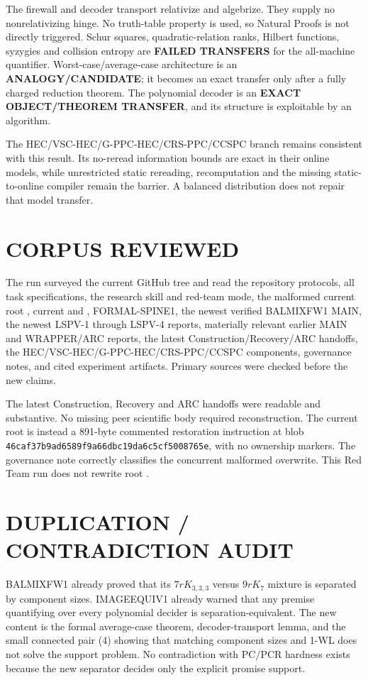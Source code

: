 \documentclass[11pt]{article}
\begin{document}
The firewall and decoder transport relativize and algebrize.  They supply no
nonrelativizing hinge.  No truth-table property is used, so Natural Proofs
is not directly triggered.  Schur squares, quadratic-relation ranks,
Hilbert functions, syzygies and collision entropy are \textbf{FAILED
TRANSFERS} for the all-machine quantifier.  Worst-case/average-case
architecture is an \textbf{ANALOGY/CANDIDATE}; it becomes an exact transfer
only after a fully charged reduction theorem.  The polynomial decoder is an
\textbf{EXACT OBJECT/THEOREM TRANSFER}, and its structure is exploitable by
an algorithm.

The HEC/VSC-HEC/G-PPC-HEC/CRS-PPC/CCSPC branch remains consistent with this
result.  Its no-reread information bounds are exact in their online models,
while unrestricted static rereading, recomputation and the missing
static-to-online compiler remain the barrier.  A balanced distribution does
not repair that model transfer.

\section{CORPUS REVIEWED}
The run surveyed the current GitHub tree and read the repository protocols,
all task specifications, the research skill and red-team mode, the malformed
current root , current  and
, FORMAL-SPINE1, the newest verified BALMIXFW1 MAIN, the
newest LSPV-1 through LSPV-4 reports, materially relevant earlier MAIN and
WRAPPER/ARC reports, the latest Construction/Recovery/ARC handoffs, the
HEC/VSC-HEC/G-PPC-HEC/CRS-PPC/CCSPC components, governance notes, and cited
experiment artifacts.  Primary sources \cite{bt,hk,conneryd,flmv} were
checked before the new claims.

The latest Construction, Recovery and ARC handoffs were readable and
substantive.  No missing peer scientific body required reconstruction.  The
current root is instead a 891-byte commented restoration instruction at blob
\texttt{46caf37b9ad6589f9a66dbc19da6c5cf5008765e}, with no ownership markers.
The governance note correctly classifies the concurrent malformed overwrite.
This Red Team run does not rewrite root .

\section{DUPLICATION / CONTRADICTION AUDIT}
BALMIXFW1 already proved that its $7rK_{3,3,3}$ versus $9rK_7$ mixture is
separated by component sizes.  IMAGEEQUIV1 already warned that any premise
quantifying over every polynomial decider is separation-equivalent.  The new
content is the formal average-case theorem, decoder-transport lemma, and the
small connected pair (4) showing that matching component sizes and 1-WL
does not solve the support problem.  No contradiction with PC/PCR hardness
exists because the new separator decides only the explicit promise support.
\end{document}
